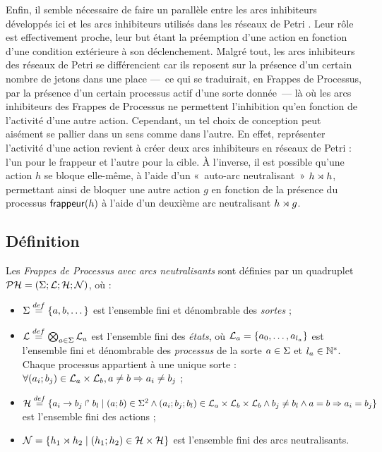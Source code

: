 Enfin, il semble nécessaire de faire un parallèle entre les arcs inhibiteurs développés ici
et les arcs inhibiteurs utilisés dans les réseaux de Petri \cite{Busi02}.
Leur rôle est effectivement proche, leur but étant la préemption d'une action en fonction
d'une condition extérieure à son déclenchement.
Malgré tout, les arcs inhibiteurs des réseaux de Petri se différencient car ils
reposent sur la présence d'un certain nombre de jetons dans une place
---~ce qui se traduirait, en Frappes de Processus,
par la présence d'un certain processus actif d'une sorte donnée~---
là où les arcs inhibiteurs des Frappes de Processus ne permettent l'inhibition
qu'en fonction de l'activité d'une autre action.
Cependant, un tel choix de conception peut aisément se pallier dans un sens comme dans l'autre.
En effet, représenter l'activité d'une action revient à créer deux arcs inhibiteurs en
réseaux de Petri : l'un pour le frappeur et l'autre pour la cible.
À l'inverse, il est possible qu'une action $h$ se bloque elle-même, à l'aide d'un 
«~auto-arc neutralisant~» $h\rtimes h$,
permettant ainsi de bloquer une autre action $g$
en fonction de la présence du processus $\mathsf{frappeur}(h)$
à l'aide d'un deuxième arc neutralisant $h\rtimes g$.

\subsection{Définition}

\begin{definition}
  Les \emph{Frappes de Processus avec arcs neutralisants} sont définies par
  un quadruplet $\mathcal{PH} = (\Sigma ; \mathcal{L} ; \mathcal{H} ; \mathcal{N})$, où :
  \begin{itemize}
    \item $\Sigma \stackrel{def}= \{a, b, \dots\}$ est l'ensemble fini et dénombrable des \emph{sortes} ;
    \item $\mathcal{L} \stackrel{def}= \bigotimes_{a \in \Sigma} \mathcal{L}_a$ est l'ensemble fini des \emph{états},
      où $\mathcal{L}_a = \{a_0, \ldots, a_{l_a}\}$ est l'ensemble fini et dénombrable
      des \emph{processus} de la sorte $a \in \Sigma$ et $l_a \in \mathbb{N}^*$.
      Chaque processus appartient à une unique sorte :
      $\forall (a_i; b_j) \in \mathcal{L}_a \times \mathcal{L}_b, a \neq b \Rightarrow a_i \neq b_j$ ;
    \item $\mathcal{H} \stackrel{def}= \{a_i\rightarrow b_j\Rsh b_l \mid (a; b) \in \Sigma^2 \wedge
      (a_i; b_j; b_l) \in \mathcal{L}_a \times \mathcal{L}_b \times \mathcal{L}_b \wedge
      b_j \neq b_l \wedge a = b \Rightarrow a_i = b_j \}$ est l'ensemble fini des actions ;
    \item $\mathcal{N} = \{h_1\rtimes h_2 \mid (h_1 ; h_2) \in \mathcal{H} \times \mathcal{H}\}$
      est l'ensemble fini des arcs neutralisants.
  \end{itemize}
\end{definition}

